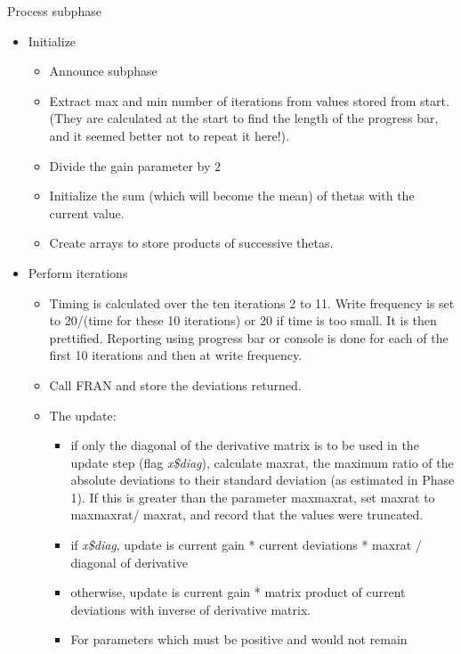 \documentclass[12pt,a4paper]{article}
\makeatletter
\renewcommand{\=}{\,=\,}
\newcommand{\+}{\,+\,}
\newcommand{\nm}[1]{\textsf{ #1}}
\newcommand{\nnm}[1]{\textsf{\textit{#1}}}
\newcommand{\nmm}[1]{\nnm{#1}}
\renewcommand{\subsubsection}{\@startsection{subsubsection}{3}
                {0pt}{0.5\baselineskip}{0.3\baselineskip}
                {\it\sffamily} }
\makeatother
\begin{document}
\subsubsection{Process subphase}
\begin{itemize}
\item Initialize
  \begin{itemize}
  \item
    Announce subphase
  \item Extract max and min number of iterations from values stored
    from start. (They are calculated at the start to find the length
    of the progress bar, and it seemed better not to repeat it here!).
  \item Divide the gain parameter by 2
  \item Initialize the sum (which will become the mean) of thetas with
    the current value.
  \item
    Create arrays to store products of successive thetas.
  \end{itemize}
\item
  Perform iterations
  \begin{itemize}
  \item Timing is calculated over the ten iterations 2 to 11. Write frequency is
    set to 20/(time for these 10 iterations) or 20 if time is too small.  It is
    then prettified. Reporting using progress bar or console is done for each of
    the first 10 iterations and then at write frequency.
\item
  Call \nm{FRAN} and store the deviations returned.
  \item The update:
    \begin{itemize}
    \item if only the diagonal of the derivative matrix is to be used
      in the update step (flag \nnm{x\$diag}), calculate \nm{maxrat},
      the maximum ratio of the absolute deviations to their standard
      deviation (as estimated in Phase 1). If this is greater than the
      parameter \nm{maxmaxrat}, set \nm{maxrat} to
      \nm{maxmaxrat}/\nm{maxrat}, and record that the values were
      truncated. \label{sec:maxrat}
    \item
      if \nmm{x\$diag},
      update is current gain * current deviations * \nm{maxrat} /
      diagonal of derivative
    \item otherwise, update is current gain * matrix product of
      current deviations with inverse of derivative matrix.
    \item For parameters which must be positive and would not remain

\end{itemize}
\end{itemize}
\end{itemize}
\end{document}
